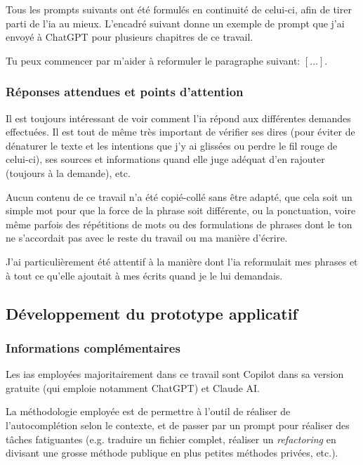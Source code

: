 Tous les prompts suivants ont été formulés en continuité de celui-ci, afin de tirer parti de l'\acrshort{ia} au mieux.
L'encadré suivant donne un exemple de prompt que j'ai envoyé à ChatGPT pour plusieurs chapitres de ce travail.
\begin{boxitup}
Tu peux commencer par m'aider à reformuler le paragraphe suivant: $[...]$.
\end{boxitup}

\subsubsection{Réponses attendues et points d'attention}
Il est toujours intéressant de voir comment l'\acrshort{ia} répond aux différentes demandes effectuées.
Il est tout de même très important de vérifier ses dires (pour éviter de dénaturer le texte et les intentions que j'y ai glissées ou perdre le fil rouge de celui-ci), ses sources et informations quand elle juge adéquat d'en rajouter (toujours à la demande), etc.

Aucun contenu de ce travail n'a été copié-collé sans être adapté, que cela soit un simple mot pour que la force de la phrase soit différente, ou la ponctuation, voire même parfois des répétitions de mots ou des formulations de phrases dont le ton ne s'accordait pas avec le reste du travail ou ma manière d'écrire.

J'ai particulièrement été attentif à la manière dont l'\acrshort{ia} reformulait mes phrases et à tout ce qu'elle ajoutait à mes écrits quand je le lui demandais.

\subsection{Développement du prototype applicatif}
\subsubsection{Informations complémentaires}
Les \acrshort{ia}s employées majoritairement dans ce travail sont Copilot dans sa version gratuite (qui emploie notamment ChatGPT) et Claude AI.

La méthodologie employée est de permettre à l'outil de réaliser de l'autocomplétion selon le contexte, et de passer par un prompt pour réaliser des tâches fatiguantes (e.g. traduire un fichier complet, réaliser un \textit{refactoring} en divisant une grosse méthode publique en plus petites méthodes privées, etc.).

